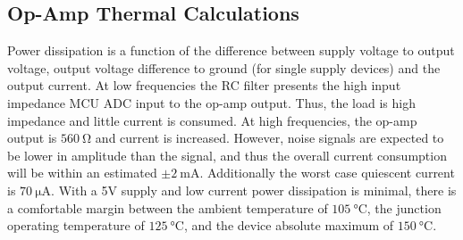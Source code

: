 \subsection{Op-Amp Thermal Calculations}
\label{ap:amplifier}
Power dissipation is a function of the difference between supply voltage to output voltage, output voltage difference to ground (for single supply devices) and the output current.
At low frequencies the RC filter presents the high input impedance MCU ADC input to the op-amp output.
Thus, the load is high impedance and little current is consumed.
At high frequencies, the op-amp output is $\SI{560}{\ohm}$ and current is increased.
However, noise signals are expected to be lower in amplitude than the signal, and thus the overall current consumption will be within an estimated $\pm \SI{2}{\milli\ampere}$.
Additionally the worst case quiescent current is $\SI{70}{\micro\ampere}$.
With a 5V supply and low current power dissipation is minimal, there is a comfortable margin between the ambient temperature of $\SI{105}{\degreeCelsius}$, the junction operating temperature of $\SI{125}{\degreeCelsius}$, and the device absolute maximum of $\SI{150}{\degreeCelsius}$.

